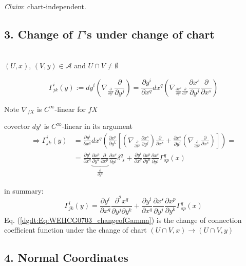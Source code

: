 \emph{Claim}: chart-independent.
	
	\subsection*{3. Change of $\Gamma$'s under change of chart} \quad \\
	
	$(U,x)$, $(V,y) \in \mathcal{A}$ and $U \cap V \neq \emptyset$
	
	\[
	\Gamma^i_{jk}(y) := dy^i \left( \nabla_{ \frac{ \partial}{ \partial y^k} } \frac{ \partial }{ \partial y^j} \right) = \frac{ \partial y^i}{ \partial x^q }dx^q \left( \nabla_{\frac{ \partial x^p}{ \partial y^k}  \frac{ \partial }{ \partial x^p} } \frac{ \partial x^s}{ \partial y^j} \frac{ \partial }{ \partial x^s } \right)
	\]
	
	Note $\nabla_{fX}$ is $C^{\infty}$-linear for $fX$
	
	covector $dy^i$ is $C^{\infty}$-linear in its argument
	\[
	\begin{aligned}
	\Longrightarrow \Gamma_{jk}^i(y) & = \frac{ \partial y^i}{ \partial x^q} dx^q \left( \frac{ \partial x^p}{ \partial y^k} \left[ \left( \nabla_{ \frac{ \partial }{ \partial x^p} } \frac{ \partial x^s}{ \partial y^j} \right) \frac{ \partial }{ \partial x^s} + \frac{ \partial x^s}{ \partial y^j} \left( \nabla_{ \frac{ \partial }{ \partial x^p } } \frac{ \partial }{ \partial x^s } \right)  \right] \right) = \\
	& = \frac{ \partial y^i}{ \partial x^q} \underbrace{\frac{ \partial x^p }{ \partial y^k} \frac{ \partial }{ \partial x^p }}_{\frac{\partial}{\partial y^k} } \frac{ \partial x^s}{ \partial y^j } \delta^q_{ \, \, s} + \frac{ \partial y^i}{ \partial x^q} \frac{ \partial x^p }{ \partial y^k} \frac{ \partial x^s}{ \partial y^j} \Gamma^q_{sp}(x)
	\end{aligned}
	\]
	
	in summary:
	\begin{equation}\label{dgdt:Eq:WEHCG0703_changeofGamma}
	\Gamma^i_{jk}(y) = \frac{ \partial y^i}{ \partial x^q} \frac{ \partial^2 x^q}{ \partial y^j \partial y^k} + \frac{ \partial y^i}{ \partial x^q } \frac{ \partial x^s }{ \partial y^j} \frac{ \partial x^p }{ \partial y^k} \Gamma^q_{sp}(x)
	\end{equation}
	Eq. (\ref{dgdt:Eq:WEHCG0703_changeofGamma}) is the change of connection coefficient function under the change of chart $(U\cap V,x) \to (U\cap V,y)$
	
	
	\subsection*{4. Normal Coordinates}
	
